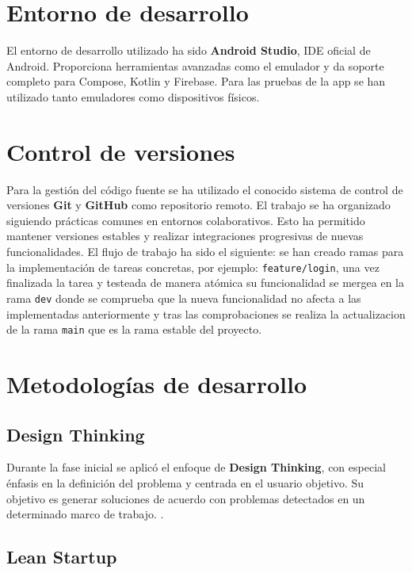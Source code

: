 \section{Entorno de desarrollo}

El entorno de desarrollo utilizado ha sido \textbf{Android Studio}, IDE oficial de Android. Proporciona herramientas avanzadas como el emulador y da soporte completo para Compose, Kotlin y Firebase. Para las pruebas de la app se han utilizado tanto emuladores como dispositivos físicos.

\section{Control de versiones}

Para la gestión del código fuente se ha utilizado el conocido sistema de control de versiones \textbf{Git} y \textbf{GitHub} como repositorio remoto. El trabajo se ha organizado siguiendo prácticas comunes en entornos colaborativos. Esto ha permitido mantener versiones estables y realizar integraciones progresivas de nuevas funcionalidades. El flujo de trabajo ha sido el siguiente: se han creado ramas para la implementación de tareas concretas, por ejemplo: \texttt{feature/login}, una vez finalizada la tarea y testeada de manera atómica su funcionalidad se mergea en la rama \texttt{dev} donde se comprueba que la nueva funcionalidad no afecta a las implementadas anteriormente y tras las comprobaciones se realiza la actualizacion de la rama \texttt{main} que es la rama estable del proyecto.

\section{Metodologías de desarrollo}

\subsection{Design Thinking}

Durante la fase inicial se aplicó el enfoque de \textbf{Design Thinking}, con especial énfasis en la definición del problema y centrada en el usuario objetivo. Su objetivo es generar soluciones de acuerdo con problemas detectados en un determinado marco de trabajo.   \cite{designthinking} \cite{designthinking-url}.

\subsection{Lean Startup}

